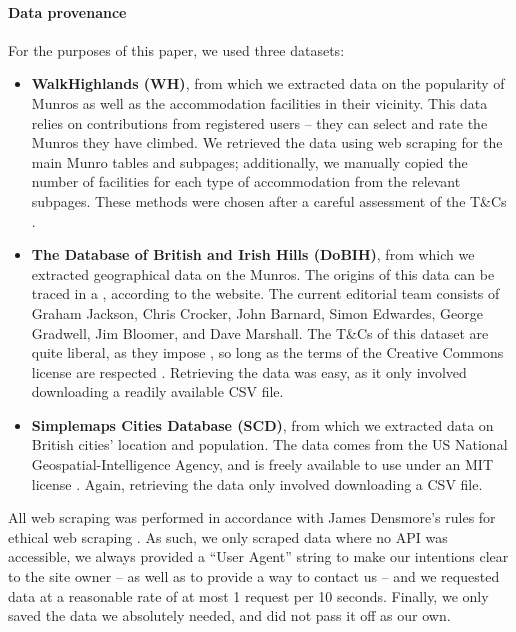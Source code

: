 \documentclass[11pt,a4paper]{article}
\begin{document}
\paragraph{Data provenance}
For the purposes of this paper, we used three datasets:
\begin{itemize}
    \item \textbf{WalkHighlands (WH)}, from which we extracted data on the popularity of Munros as well as the accommodation facilities in their vicinity. This data relies on contributions from registered users – they can select and rate the Munros they have climbed. We retrieved the data using web scraping for the main Munro tables and subpages; additionally, we manually copied the number of facilities for each type of accommodation from the relevant subpages. These methods were chosen after a careful assessment of the T\&Cs \cite{WHTC}.
    \item \textbf{The Database of British and Irish Hills (DoBIH)}, from which we extracted geographical data on the Munros. The origins of this data can be traced in a , according to the website. The current editorial team consists of Graham Jackson, Chris Crocker, John Barnard, Simon Edwardes, George Gradwell, Jim Bloomer, and Dave Marshall. The T\&Cs of this dataset are quite liberal, as they impose , so long as the terms of the Creative Commons license are respected \cite{DoBIHTC}. Retrieving the data was easy, as it only involved downloading a readily available CSV file.
    \item \textbf{Simplemaps Cities Database (SCD)}, from which we extracted data on British cities' location and population. The data comes from the US National Geospatial-Intelligence Agency, and is freely available to use under an MIT license \cite {SCDBT}. Again, retrieving the data only involved downloading a CSV file.
\end{itemize}

All web scraping was performed in accordance with James Densmore's rules for ethical web scraping \cite{EiWS}. As such, we only scraped data where no API was accessible, we always provided a “User Agent” string to make our intentions clear to the site owner – as well as to provide a way to contact us – and we requested data at a reasonable rate of at most 1 request per 10 seconds. Finally, we only saved the data we absolutely needed, and did not pass it off as our own.
\end{document}
